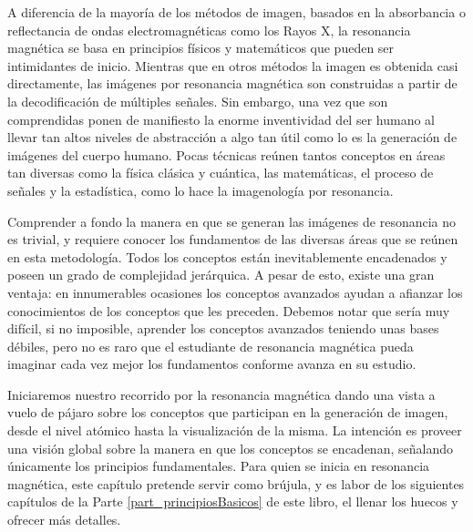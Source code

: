 A diferencia de la mayoría de los métodos de imagen, basados en la absorbancia o reflectancia de ondas electromagnéticas como los Rayos X, la resonancia magnética se basa en principios físicos y matemáticos que pueden ser intimidantes de inicio. Mientras que en otros métodos la imagen es obtenida casi directamente, las imágenes por resonancia magnética son construidas a partir de la decodificación de múltiples señales. Sin embargo, una vez que son comprendidas ponen de manifiesto la enorme inventividad del ser humano al llevar tan altos niveles de abstracción a algo tan útil como lo es la generación de imágenes del cuerpo humano. Pocas técnicas reúnen tantos conceptos en áreas tan diversas como la física clásica y cuántica, las matemáticas, el proceso de señales y la estadística, como lo hace la imagenología por resonancia.

Comprender a fondo la manera en que se generan las imágenes de resonancia no es trivial, y requiere conocer los fundamentos de las diversas áreas que se reúnen en esta metodología. Todos los conceptos están inevitablemente encadenados y poseen un grado de complejidad jerárquica. A pesar de esto, existe una gran ventaja: en innumerables ocasiones los conceptos avanzados ayudan a afianzar los conocimientos de los conceptos que les preceden. Debemos notar que sería muy difícil, si no imposible, aprender los conceptos avanzados teniendo unas bases débiles, pero no es raro que el estudiante de resonancia magnética pueda imaginar cada vez mejor los fundamentos conforme avanza en su estudio.

Iniciaremos nuestro recorrido por la resonancia magnética dando una vista a vuelo de pájaro sobre los conceptos que participan en la generación de imagen, desde el nivel atómico hasta la visualización de la misma. La intención es proveer una visión global sobre la manera en que los conceptos se encadenan, señalando únicamente los principios fundamentales. Para quien se inicia en resonancia magnética, este capítulo pretende servir como brújula, y es labor de los siguientes capítulos de la Parte \ref{part_principiosBasicos} de este libro, el llenar los huecos y ofrecer más detalles. 


